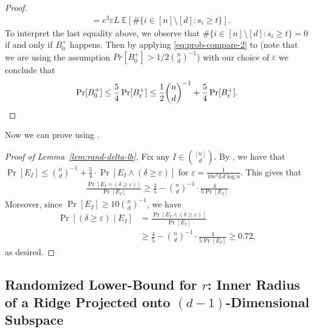 \documentclass{theoretics}
\newcommand{\E}{\mathbb E}
\newcommand{\eps}{\varepsilon} %
\begin{document}
\begin{proof}
\begin{align}
      &= e^3 \eps L \; \E[\#\{i \in [n] \setminus [d] : s_i \geq t \}]. \label{eq:prob-compare-2}
    \end{align}
    To interpret the last equality above, we observe that
    $\#\{i \in [n] \setminus [d] : s_i \geq t \} = 0$ if and only if $B_0^+$ happens.
    Then by applying \eqref{eq:prob-compare-2} to  (note that we are using the assumption $Pr[B_{0}^{+}] > 1/2 \binom{n}{d}^{-1}$) with our choice of $\eps$
    we conclude that 
    \[
    \Pr[B_{0}^{+}] \leq \frac{5}{4} \Pr[B_{\varepsilon}^{+}] \leq \frac{1}{2} \binom{n}{d}^{-1} + \frac{5}{4} \Pr[B_{\varepsilon}^{+}].\qedhere
    \]
\end{proof}



Now we can prove  using .

\begin{proof}[Proof of Lemma~\ref{lem:rand-delta-lb}]
    Fix any $I \in \binom{[n]}{d}$.
    By , we have that $\Pr[E_I ] \leq \binom{n}{d}^{-1} + \frac{5}{4} \cdot \Pr[E_I  \wedge (\delta \geq \eps)]$ for $\eps = \frac{1}{10e^3 Ld\log n}$.
    This gives that
    \begin{align*}
         \frac{\Pr[E_I  \wedge (\delta \geq \eps)]}{\Pr[E_I ]}  \geq \frac{4}{5} - \binom{n}{d}^{-1} \cdot \frac{4}{5\Pr[E_I ]}
    \end{align*}
    Moreover, since $\Pr[E_I ] \geq 10 \binom{n}{d}^{-1}$, we have
    \begin{align*}
        \Pr[(\delta \geq \eps) \mid E_I  ] &= \frac{\Pr[E_I  \wedge (\delta \geq \eps)]}{\Pr[E_I  ]} \\
        &\geq \frac{4}{5} - \binom{n}{d}^{-1} \cdot \frac{4}{5\Pr[E_I ]} \geq 0.72,
    \end{align*}
    as desired.
\end{proof}


\subsection{Randomized Lower-Bound for \texorpdfstring{$r$}{r}: Inner Radius of a Ridge Projected onto \texorpdfstring{$(d-1)$}{d-1}-Dimensional Subspace}\label{sub:rand-r-lb}
\end{document}

